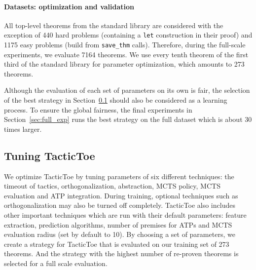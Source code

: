 \documentclass[runningheads,a4paper,draft]{svjour3}
\def\tactictoe{\textsf{TacticToe}\xspace}
\begin{document}
\paragraph{Datasets: optimization and validation}
All top-level theorems from the standard library are considered with the
exception of 440 hard problems (containing a \texttt{let} construction in their
proof) and 1175 easy problems (build from \texttt{save\_thm} calls).
Therefore, during the full-scale experiments, we evaluate 7164 theorems.
We use every tenth theorem of the first third of the standard library for
parameter optimization, which amounts to 273 theorems.

Although the evaluation of each set of parameters on its own is fair,
the selection of the best strategy in Section~\ref{sec:tuning} should also be
considered as a learning process. To ensure the global fairness, the final
experiments in Section~\ref{sec:full_exp} runs the best strategy on the full
dataset which is about 30 times larger.

\subsection{Tuning \tactictoe}\label{sec:tuning}

We optimize \tactictoe by tuning parameters of six different techniques:
the timeout of tactics, orthogonalization, abstraction, MCTS policy, MCTS
evaluation and ATP integration. During training, optional techniques such as
orthogonalization may also be turned off completely.
\tactictoe also includes other important techniques which are run with their
default parameters: feature extraction, prediction
algorithms, number of premises for ATPs and MCTS evaluation radius (set by default to
10).
By choosing a set of parameters, we create a strategy for
\tactictoe that is evaluated on our training set of 273 theorems. And the
strategy with the highest number of re-proven theorems is selected for
a full scale evaluation.
\end{document}
